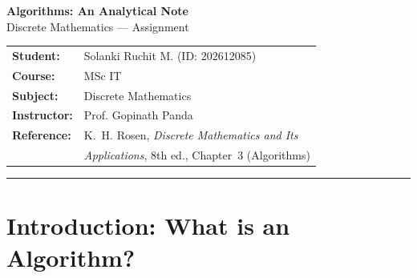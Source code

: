 \documentclass[11pt,a4paper]{article}
\theoremstyle{definition}
\theoremstyle{plain}
\newcommand{\bigO}{\mathcal{O}}
\newcommand{\bigOmega}{\Omega}
\newcommand{\bigTheta}{\Theta}
\begin{document}
\begin{center}
{\LARGE\bfseries\color{navy} Algorithms: An Analytical Note}\\[6pt]
{\large Discrete Mathematics --- Assignment}\\[10pt]
{\small
\begin{tabular}{@{}ll@{}}
\textbf{Student:} & Solanki Ruchit M. \quad (ID: 202612085)\\
\textbf{Course:} & MSc IT\\
\textbf{Subject:} & Discrete Mathematics\\
\textbf{Instructor:} & Prof. Gopinath Panda\\
\textbf{Reference:} & K.~H. Rosen, \emph{Discrete Mathematics and Its}\\
& \emph{Applications}, 8th ed., Chapter~3 (Algorithms)\\
\end{tabular}}
\end{center}
\vspace{-4pt}
\hrule
\vspace{6pt}

\begin{abstract}
\noindent
This note presents a complete, self--contained treatment of \emph{algorithms} as
developed in Chapter~3 of Rosen's \emph{Discrete Mathematics and Its Applications}.
It answers four questions in order: \textbf{(i)}~what exactly an algorithm is and
which properties make a procedure an algorithm; \textbf{(ii)}~the principal
\emph{types} of algorithms (searching, sorting, greedy and divide--and--conquer);
\textbf{(iii)}~how the \emph{growth of functions} is measured formally with the
$\bigO$, $\bigOmega$ and $\bigTheta$ notations; and \textbf{(iv)}~how
\emph{complexity} is analysed in the worst, average and best cases, together with
the notion of tractability. Every definition is stated formally and illustrated
with a small diagram, and each claim about running time is justified
analytically. The companion artefacts of this submission are the LaTeX
pseudocode file, the executed Jupyter notebook and the interactive HTML
dashboard.
\end{abstract}

\section{Introduction: What is an Algorithm?}
\end{document}
